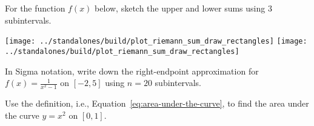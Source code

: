 \documentclass[../main.tex]{subfiles}
\begin{document}
  \begin{example}
    For the function \(f(x)\) below, sketch the upper and lower sums using \(3\) subintervals.

    \hfill{}
    \texttt{[image: ../standalones/build/plot\_riemann\_sum\_draw\_rectangles]}
    \hfill{}
    \texttt{[image: ../standalones/build/plot\_riemann\_sum\_draw\_rectangles]}
    \hfill{}

  \end{example}

  \begin{example}
    In Sigma notation, write down the right-endpoint approximation for \(f(x) = \frac{1}{x^{2} - 1}\) on \([-2, 5]\) using \(n = 20\) subintervals.
  \end{example}
  \clearpage

  \begin{example}
    Use the definition, i.e., Equation~\eqref{eq:area-under-the-curve}, to find the area under the curve \(y = x^{2}\) on \([0,1]\).

  \end{example}
\end{document}
